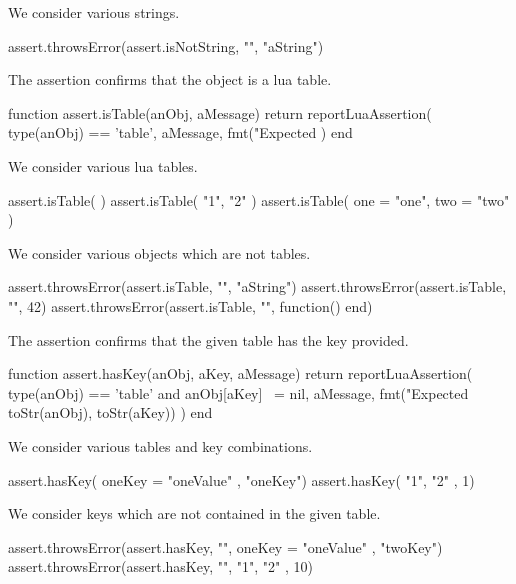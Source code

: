 We consider various strings.

\startLuaTest
  assert.throwsError(assert.isNotString, "", "aString")
\stopLuaTest
\stopTestCase

\stopTestSuite


The  assertion confirms that the object is a lua 
table. 

\startLuaCode
function assert.isTable(anObj, aMessage)
  return reportLuaAssertion(
    type(anObj) == 'table',
    aMessage,
    fmt("Expected %
  )
end
\stopLuaCode


We consider various lua tables.

\startLuaTest
  assert.isTable({ })
  assert.isTable({ "1", "2" })
  assert.isTable({ one = "one", two = "two" })
\stopLuaTest
\stopTestCase


We consider various objects which are not tables. 

\startLuaTest
  assert.throwsError(assert.isTable, "", "aString")
  assert.throwsError(assert.isTable, "", 42)
  assert.throwsError(assert.isTable, "", function() end)
\stopLuaTest
\stopTestCase

\stopTestSuite


The  assertion confirms that the given table has the 
key provided. 

\startLuaCode
function assert.hasKey(anObj, aKey, aMessage)
  return reportLuaAssertion(
    type(anObj) == 'table' and anObj[aKey] ~= nil,
    aMessage,
    fmt("Expected %
      toStr(anObj), toStr(aKey))
  )
end
\stopLuaCode


We consider various tables and key combinations.

\startLuaTest
  assert.hasKey({ oneKey = "oneValue" }, "oneKey")
  assert.hasKey({ "1", "2" }, 1)
\stopLuaTest
\stopTestCase


We consider keys which are not contained in the given table. 

\startLuaTest
  assert.throwsError(assert.hasKey, "",
    { oneKey = "oneValue" }, "twoKey")
  assert.throwsError(assert.hasKey, "",
    { "1", "2" }, 10)
\stopLuaTest
\stopTestCase

